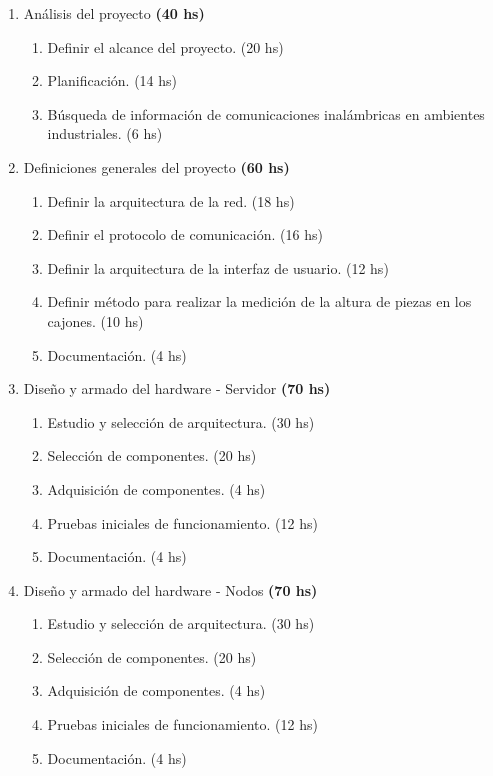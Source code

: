 \documentclass[11pt]{charter}
\begin{document}
\begin{enumerate}
    \item Análisis del proyecto \textbf{(40 hs)}
    \begin{enumerate}
        \item Definir el alcance del proyecto. (20 hs)
        \item Planificación. (14 hs)
        \item Búsqueda de información de comunicaciones inalámbricas en ambientes industriales. (6 hs)
    \end{enumerate}
    \item Definiciones generales del proyecto \textbf{(60 hs)}
    \begin{enumerate}
        \item Definir la arquitectura de la red. (18 hs)
        \item Definir el protocolo de comunicación. (16 hs)
        \item Definir la arquitectura de la interfaz de usuario. (12 hs)
        \item Definir método para realizar la medición de la altura de piezas en los cajones. (10 hs)
        \item Documentación. (4 hs)
    \end{enumerate}
    \item Diseño y armado del hardware - Servidor \textbf{(70 hs)}
    \begin{enumerate}
        \item Estudio y selección de arquitectura. (30 hs)
        \item Selección de componentes. (20 hs)
        \item Adquisición de componentes. (4 hs)
        \item Pruebas iniciales de funcionamiento. (12 hs)
        \item Documentación. (4 hs)
    \end{enumerate}
    \item Diseño y armado del hardware - Nodos \textbf{(70 hs)}
    \begin{enumerate}
        \item Estudio y selección de arquitectura. (30 hs)
        \item Selección de componentes. (20 hs)
        \item Adquisición de componentes. (4 hs)
        \item Pruebas iniciales de funcionamiento. (12 hs)
        \item Documentación. (4 hs)

\end{enumerate}
\end{enumerate}
\end{document}
